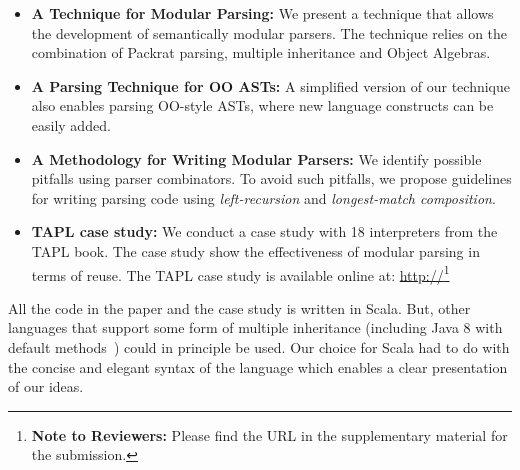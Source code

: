 \begin{itemize}[leftmargin=*]

\item \textbf{A Technique for Modular Parsing:}
  We present a technique that allows the development of semantically modular parsers.
  The technique relies on the combination of Packrat parsing, multiple inheritance
  and Object Algebras.

\item \textbf{A Parsing Technique for OO ASTs:} A simplified version of
  our technique also enables parsing OO-style ASTs, where new language
  constructs can be easily added.

\item \textbf{A Methodology for Writing Modular Parsers:} We
  identify possible pitfalls using parser combinators. To avoid such
  pitfalls, we propose guidelines for writing parsing code using
  \emph{left-recursion} and \emph{longest-match composition}.

\item \textbf{TAPL case study:} We conduct a case study with 18 interpreters
  from the TAPL book. The case study show the effectiveness of modular
  parsing in terms of reuse. The TAPL case study is available online
  at:
  \url{http://}\footnote{\textbf{Note to Reviewers:} Please find the URL in the
    supplementary material for the submission.}

\end{itemize}

All the code in the paper and the case study is written in Scala. But,
other languages that support some form of multiple inheritance
(including Java 8 with default methods~\cite{Goetz2012}) could in principle be
used. Our choice for Scala had to do with the concise and elegant syntax
of the language which enables a clear presentation of our ideas.
